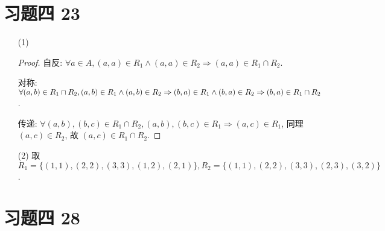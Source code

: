 \section{习题四 23}

\begin{itemize}
	\item[(1)]
	\begin{proof}
		自反: $\forall a \in A, (a,a)\in R_1\wedge(a,a) \in R_2\Rightarrow (a,a)\in R_1 \cap R_2$.
		
		对称: $\forall (a,b) \in R_1 \cap R_2,(a,b) \in R_1\wedge (a,b)\in R_2\Rightarrow (b,a) \in R_1\wedge (b,a)\in R_2\\
		\Rightarrow (b,a) \in R_1 \cap R_2$.
		
		传递: $\forall (a,b),(b,c) \in R_1\cap R_2,(a,b),(b,c) \in R_1\Rightarrow (a,c) \in R_1$, 同理 $(a,c) \in R_2$, 故 $(a,c) \in R_1\cap R_2$.
	\end{proof}
	\item[(2)] 取 $R_1=\{(1,1),(2,2),(3,3),(1,2),(2,1)\},R_2=\{(1,1),(2,2),(3,3),(2,3),(3,2)\}$.
\end{itemize}

\section{习题四 28}


